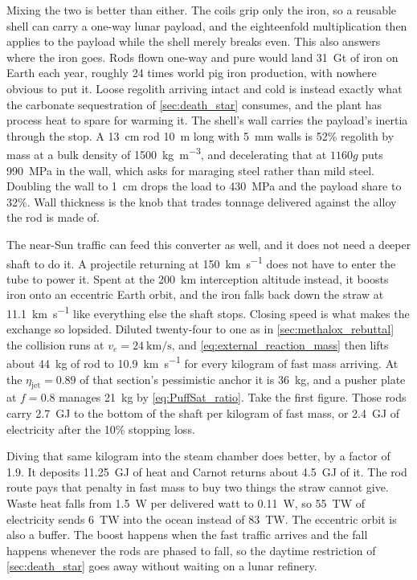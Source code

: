\documentclass{article}
\begin{document}
Mixing the two is better than either.  The coils grip only the iron, so a reusable shell can carry a one-way lunar payload, and the eighteenfold multiplication then applies to the payload while the shell merely breaks even.  This also answers where the iron goes.  Rods flown one-way and pure would land \SI{31}{\giga\tonne} of iron on Earth each year, roughly 24 times world pig iron production, with nowhere obvious to put it.  Loose regolith arriving intact and cold is instead exactly what the carbonate sequestration of \autoref{sec:death_star} consumes, and the plant has process heat to spare for warming it.  The shell's wall carries the payload's inertia through the stop.  A \SI{13}{\centi\meter} rod \SI{10}{\meter} long with \SI{5}{\milli\meter} walls is 52\% regolith by mass at a bulk density of \SI{1500}{\kilo\gram\per\cubic\meter}, and decelerating that at $1160g$ puts \SI{990}{\mega\pascal} in the wall, which asks for maraging steel rather than mild steel.  Doubling the wall to \SI{1}{\centi\meter} drops the load to \SI{430}{\mega\pascal} and the payload share to 32\%.  Wall thickness is the knob that trades tonnage delivered against the alloy the rod is made of.

The near-Sun traffic can feed this converter as well, and it does not need a deeper shaft to do it.  A projectile returning at \SI{150}{\kilo\meter\per\second} does not have to enter the tube to power it.  Spent at the \SI{200}{\kilo\meter} interception altitude instead, it boosts iron onto an eccentric Earth orbit, and the iron falls back down the straw at \SI{11.1}{\kilo\meter\per\second} like everything else the shaft stops.  Closing speed is what makes the exchange so lopsided.  Diluted twenty-four to one as in \autoref{sec:methalox_rebuttal} the collision runs at $v_e = \SI{24}{\kilo\meter\per\second}$, and \autoref{eq:external_reaction_mass} then lifts about \SI{44}{\kilo\gram} of rod to \SI{10.9}{\kilo\meter\per\second} for every kilogram of fast mass arriving.  At the $\eta_{\mathrm{jet}} = 0.89$ of that section's pessimistic anchor it is \SI{36}{\kilo\gram}, and a pusher plate at $f = 0.8$ manages \SI{21}{\kilo\gram} by \autoref{eq:PuffSat_ratio}.  Take the first figure.  Those rods carry \SI{2.7}{\giga\joule} to the bottom of the shaft per kilogram of fast mass, or \SI{2.4}{\giga\joule} of electricity after the 10\% stopping loss.

Diving that same kilogram into the steam chamber does better, by a factor of 1.9.  It deposits \SI{11.25}{\giga\joule} of heat and Carnot returns about \SI{4.5}{\giga\joule} of it.  The rod route pays that penalty in fast mass to buy two things the straw cannot give.  Waste heat falls from \SI{1.5}{\watt} per delivered watt to \SI{0.11}{\watt}, so \SI{55}{\tera\watt} of electricity sends \SI{6}{\tera\watt} into the ocean instead of \SI{83}{\tera\watt}.  The eccentric orbit is also a buffer.  The boost happens when the fast traffic arrives and the fall happens whenever the rods are phased to fall, so the daytime restriction of \autoref{sec:death_star} goes away without waiting on a lunar refinery.
\end{document}
